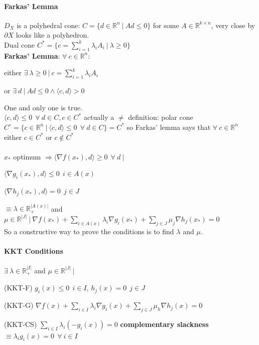 \documentclass[10pt]{report}
\begin{document}
\paragraph{Farkas' Lemma} $D_X$ is a polyhedral cone: $C=\{d\in \mathbb{R}^n\:|\:Ad\leq 0\}$ for some $A\in \mathbb{R}^{k\times n}$, very close by $\partial X$ looks like a polyhedron.\\
Dual cone $C^*=\{c=\sum_{i=1}^k\lambda_iA_i\:|\:\lambda \geq 0\}$\\
\textbf{Farkas' Lemma}: $\forall\:c\in \mathbb{R}^n$:
\begin{list}{}{}
	\item either $\exists\:\lambda\geq 0\:|\:c = \sum_{i=1}^k \lambda_iA_i$
	\item or $\exists\:d\:|\:Ad\leq 0\wedge\langle c,d\rangle > 0$
\end{list}
One and only one is true.\\
$\langle c,d\rangle \leq 0\:\:\forall\:d\in C, c\in C^*$ actually a $\neq$ definition: polar cone $C^\circ=\{c\in \mathbb{R}^n\:|\:\langle c,d\rangle\leq 0\:\:\forall\:d\in C\}=C^*$ so Farkas' lemma says that $\forall\:c\in \mathbb{R}^n$ either $c\in C^*$ or $c\not\in C^*$\\\\
$x_*$ optimum $\Rightarrow \langle\nabla f(x_*),d\rangle\geq 0\:\:\forall\:d\:|\:$
\begin{list}{}{}
	\item $\langle\nabla g_i(x_*),d\rangle\leq 0\:\:i\in A(x)$
	\item $\langle\nabla h_j(x_*),d\rangle = 0\:\:j\in J$
\end{list}
$\equiv\lambda\in \mathbb{R}_+^{|A(x)|}$ and $\mu \in \mathbb{R}^{|J|}\:|\:\nabla f(x_*) + \sum_{i\in A(x)}\lambda_i\nabla g_i(x_*) + \sum_{j\in J} \mu_j\nabla h_j(x_*)=0$\\
So a constructive way to prove the conditions is to find $\lambda$ and $\mu$.
\paragraph{KKT Conditions} $\exists\:\lambda\in \mathbb{R}_+^{|I|}$ and $\mu\in \mathbb{R}^{|J|}\:|$\begin{list}{}{}
	\item[(KKT-F)] $g_i(x)\leq 0\:\:i\in I$, $h_j(x) = 0\:\:j\in J$
	\item[(KKT-G)] $\nabla f(x) + \sum_{i\in I}\lambda_i\nabla g_i(x) + \sum_{j\in J}\mu_h\nabla h_j(x) = 0$
	\item[(KKT-CS)] $\sum_{i\in I}\lambda_i(-g_i(x)) = 0$ \textbf{complementary slackness} $\equiv \lambda_ig_i(x) = 0\:\:\forall\:i\in I$
\end{list}
\end{document}
